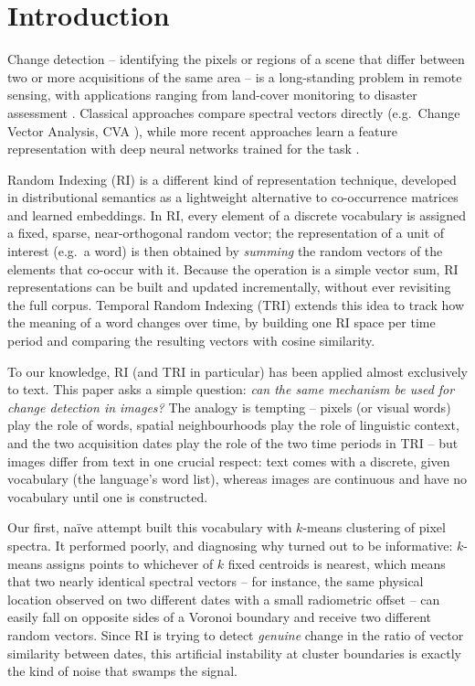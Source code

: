 \documentclass[11pt]{article}
\begin{document}
\section{Introduction}

Change detection -- identifying the pixels or regions of a scene that differ between two or more acquisitions of the same area -- is a long-standing problem in remote sensing, with applications ranging from land-cover monitoring to disaster assessment \citep{liu2019review}. Classical approaches compare spectral vectors directly (e.g.\ Change Vector Analysis, CVA \citep{malila1980}), while more recent approaches learn a feature representation with deep neural networks trained for the task \citep{wang2019getnet}.

Random Indexing (RI) \citep{kanerva1988} is a different kind of representation technique, developed in distributional semantics as a lightweight alternative to co-occurrence matrices and learned embeddings. In RI, every element of a discrete vocabulary is assigned a fixed, sparse, near-orthogonal random vector; the representation of a unit of interest (e.g.\ a word) is then obtained by \emph{summing} the random vectors of the elements that co-occur with it. Because the operation is a simple vector sum, RI representations can be built and updated incrementally, without ever revisiting the full corpus. Temporal Random Indexing (TRI) \citep{basile2014tri,caputo2015tri} extends this idea to track how the meaning of a word changes over time, by building one RI space per time period and comparing the resulting vectors with cosine similarity.

To our knowledge, RI (and TRI in particular) has been applied almost exclusively to text. This paper asks a simple question: \emph{can the same mechanism be used for change detection in images?} The analogy is tempting -- pixels (or visual words) play the role of words, spatial neighbourhoods play the role of linguistic context, and the two acquisition dates play the role of the two time periods in TRI -- but images differ from text in one crucial respect: text comes with a discrete, given vocabulary (the language's word list), whereas images are continuous and have no vocabulary until one is constructed.

Our first, na\"ive attempt built this vocabulary with $k$-means clustering of pixel spectra. It performed poorly, and diagnosing why turned out to be informative: $k$-means assigns points to whichever of $k$ fixed centroids is nearest, which means that two nearly identical spectral vectors -- for instance, the same physical location observed on two different dates with a small radiometric offset -- can easily fall on opposite sides of a Voronoi boundary and receive two different random vectors. Since RI is trying to detect \emph{genuine} change in the ratio of vector similarity between dates, this artificial instability at cluster boundaries is exactly the kind of noise that swamps the signal.
\end{document}
